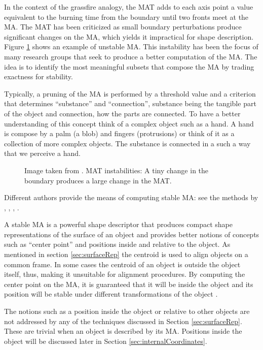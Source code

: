 In the context of the grassfire analogy, the MAT adds to each axis point a value equivalent to the burning time from the boundary 
until two fronts meet at the MA.
The MAT has been criticized as small boundary perturbations produce significant changes
on the MA, which yields it impractical for shape description. Figure \ref{fig:unstable} shows 
an example of unstable MA.
This instability has been the focus of many research groups that seek 
to produce a better computation of the MA. 
The idea is to identify the most meaningful 
subsets that compose the MA by trading exactness for stability.

Typically, a pruning of the MA is performed by a threshold value and a criterion that determines
``substance'' and ``connection'', substance being the tangible part of the object and connection, 
how the parts are connected. 
To have a better understanding of this concept think of a complex object such as a hand. 
A hand is compose by a palm (a blob) and fingers (protrusions) or 
think of it as a collection of more complex objects. The substance is
connected in a such a way that we perceive a hand.

\begin{figure} 
 \centering 
 \caption[MAT instabilities.]{Image taken from \cite{katz2003untangling}. MAT instabilities: A tiny change in the boundary produces a large change in the MAT.}
 \label{fig:unstable}  
\end{figure}

Different authors provide the means of computing stable MA: see the methods by
\cite{culver1999accurate}, \cite{amenta2001power}, \cite{katz2003untangling}, \cite{miklos2010discrete}. 

A stable MA is a powerful shape descriptor that
produces compact shape representations of the surface of an object and provides better notions of concepts such as ``center point'' and 
positions inside and relative to the object.
As mentioned in section \ref{sec:surfaceRep} the centroid is used
to align objects on a common frame. In some cases the centroid 
of an object is outside the object itself, thus, making it unsuitable for alignment procedures.
By computing the center point on the MA, it is guaranteed that it will 
be inside the object and its position will be stable under different transformations of the object \cite{liu2011extended}.

The notions such as a position inside the object or relative to other objects are not addressed 
by any of the techniques discussed in Section \ref{sec:surfaceRep}.
These are trivial when an object is described by its MA. 
Positions inside the object will be discussed later in Section \ref{sec:internalCoordinates}.

